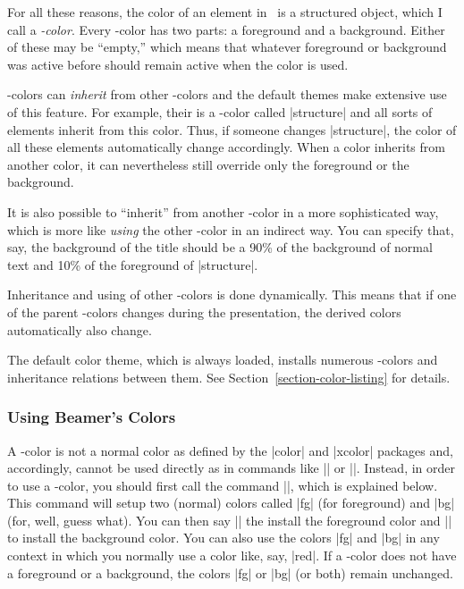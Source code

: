 For all these reasons, the color of an element in \beamer\ is a
structured object, which I call a \emph{\beamer-color}. Every
\beamer-color has two parts: a foreground and a background. Either of
these may be ``empty,'' which means that whatever foreground or
background was active before should remain active when the color is
used.

\beamer-colors can \emph{inherit} from other \beamer-colors and the
default themes make extensive use of this feature. For example, their
is a \beamer-color called |structure| and all sorts of elements
inherit from this color. Thus, if someone changes |structure|, the
color of all these elements automatically change accordingly. When a
color inherits from another color, it can nevertheless still override
only the foreground or the background.

It is also possible to ``inherit'' from another \beamer-color in a more
sophisticated way, which is more like \emph{using} the other
\beamer-color in an indirect way. You can specify that, say, the
background of the title should be a 90\% of the background of normal
text and 10\% of the foreground of |structure|.

Inheritance and using of other \beamer-colors is done
dynamically. This means that if one of the parent \beamer-colors
changes during the presentation, the derived colors automatically also
change.

The default color theme, which is always loaded, installs numerous
\beamer-colors and inheritance relations between them. See
Section~\ref{section-color-listing} for details.



\subsubsection{Using Beamer's Colors}

A \beamer-color is not a normal color as defined by the |color| and
|xcolor| packages and, accordingly, cannot be used directly as in
commands like |\color| or ||. Instead, in order to use a
\beamer-color, you should first call the command |\usebeamercolor|,
which is explained below. This command will setup two (normal) colors
called |fg| (for foreground) and |bg| (for, well, guess what). You can
then say |\color{fg}| the install the foreground color and
|\color{bg}| to install the background color. You can also use the
colors |fg| and |bg| in any context in which you normally use a color
like, say, |red|. If a \beamer-color does not have a foreground or a
background, the colors |fg| or |bg| (or both) remain unchanged. 

